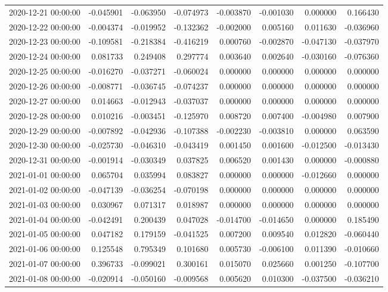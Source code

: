 \begin{tabular}{lrrrrrrr}
2020-12-21 00:00:00 & -0.045901 & -0.063950 & -0.074973 & -0.003870 & -0.001030 & 0.000000 & 0.166430 \\
2020-12-22 00:00:00 & -0.004374 & -0.019952 & -0.132362 & -0.002000 & 0.005160 & 0.011630 & -0.036960 \\
2020-12-23 00:00:00 & -0.109581 & -0.218384 & -0.416219 & 0.000760 & -0.002870 & -0.047130 & -0.037970 \\
2020-12-24 00:00:00 & 0.081733 & 0.249408 & 0.297774 & 0.003640 & 0.002640 & -0.030160 & -0.076360 \\
2020-12-25 00:00:00 & -0.016270 & -0.037271 & -0.060024 & 0.000000 & 0.000000 & 0.000000 & 0.000000 \\
2020-12-26 00:00:00 & -0.008771 & -0.036745 & -0.074237 & 0.000000 & 0.000000 & 0.000000 & 0.000000 \\
2020-12-27 00:00:00 & 0.014663 & -0.012943 & -0.037037 & 0.000000 & 0.000000 & 0.000000 & 0.000000 \\
2020-12-28 00:00:00 & 0.010216 & -0.003451 & -0.125970 & 0.008720 & 0.007400 & -0.004980 & 0.007900 \\
2020-12-29 00:00:00 & -0.007892 & -0.042936 & -0.107388 & -0.002230 & -0.003810 & 0.000000 & 0.063590 \\
2020-12-30 00:00:00 & -0.025730 & -0.046310 & -0.043419 & 0.001450 & 0.001600 & -0.012500 & -0.013430 \\
2020-12-31 00:00:00 & -0.001914 & -0.030349 & 0.037825 & 0.006520 & 0.001430 & 0.000000 & -0.000880 \\
2021-01-01 00:00:00 & 0.065704 & 0.035994 & 0.083827 & 0.000000 & 0.000000 & -0.012660 & 0.000000 \\
2021-01-02 00:00:00 & -0.047139 & -0.036254 & -0.070198 & 0.000000 & 0.000000 & 0.000000 & 0.000000 \\
2021-01-03 00:00:00 & 0.030967 & 0.071317 & 0.018987 & 0.000000 & 0.000000 & 0.000000 & 0.000000 \\
2021-01-04 00:00:00 & -0.042491 & 0.200439 & 0.047028 & -0.014700 & -0.014650 & 0.000000 & 0.185490 \\
2021-01-05 00:00:00 & 0.047182 & 0.179159 & -0.041525 & 0.007200 & 0.009540 & 0.012820 & -0.060440 \\
2021-01-06 00:00:00 & 0.125548 & 0.795349 & 0.101680 & 0.005730 & -0.006100 & 0.011390 & -0.010660 \\
2021-01-07 00:00:00 & 0.396733 & -0.099021 & 0.300161 & 0.015070 & 0.025660 & 0.001250 & -0.107700 \\
2021-01-08 00:00:00 & -0.020914 & -0.050160 & -0.009568 & 0.005620 & 0.010300 & -0.037500 & -0.036210 \\

\end{tabular}
